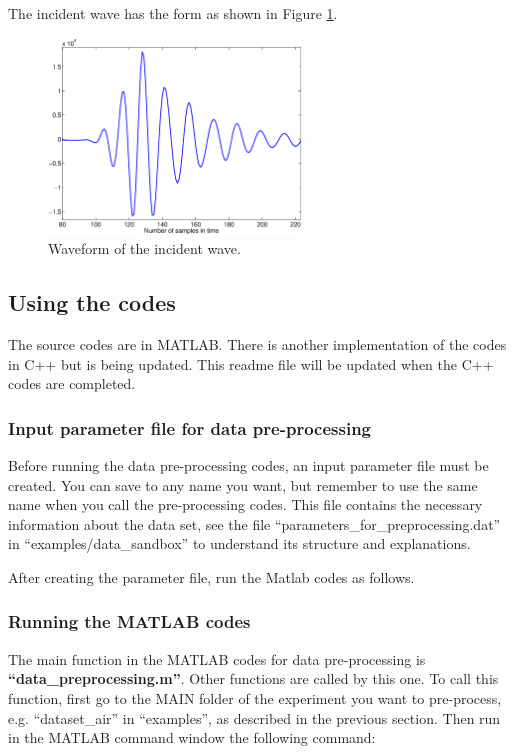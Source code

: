 \documentclass[a4paper,12pt]{article}
\begin{document}
The incident wave has the form as shown in Figure \ref{fig0}.
\begin{figure}[tph]
   \centering
 \includegraphics[width=0.6\textwidth]{figure/incident_wave}
  \caption{Waveform of the incident wave.} 
  \label{fig0}
\end{figure}




\subsection{Using the codes}\label{sec:int}

The source codes are in MATLAB. There is another implementation of the codes in C++ but is being updated. This readme file will be updated when the C++ codes are completed. 

\subsubsection{Input parameter file for data pre-processing}
Before running the data pre-processing codes, an input parameter file must be created. You can save to any name you want, but remember to use the same name when you call the pre-processing codes. This file contains the necessary information about the data set, see the file ``parameters\_for\_preprocessing.dat'' in ``examples/data\_sandbox'' to understand its structure and explanations. 

After creating the parameter file, run the Matlab codes as follows. 

\subsubsection{Running the MATLAB codes}

The main function in the MATLAB codes for data pre-processing is \textbf{``data\_preprocessing.m''}. Other functions are called by this one. To call this function, first go to the MAIN folder of the experiment you want to pre-process, e.g. ``dataset\_air'' in ``examples'', as described in the previous section. Then run in the MATLAB command window the following command:
\end{document}
